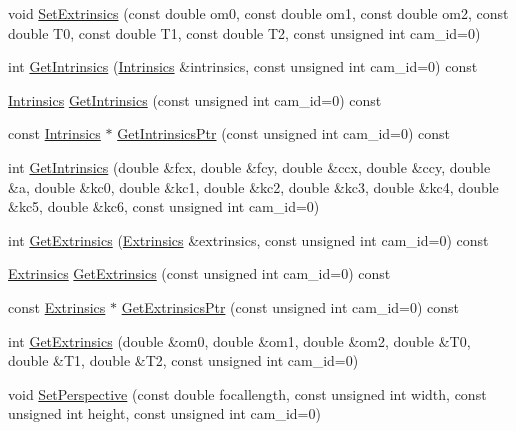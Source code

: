 \begin{DoxyCompactItemize}
\item 
void \hyperlink{classsvl_sample_camera_geometry_aaf76200111c3e78b6b8ad3593d0abcbe}{Set\-Extrinsics} (const double om0, const double om1, const double om2, const double T0, const double T1, const double T2, const unsigned int cam\-\_\-id=0)
\item 
int \hyperlink{classsvl_sample_camera_geometry_a0605f6149bc673ddda2fdff62e18fb52}{Get\-Intrinsics} (\hyperlink{structsvl_sample_camera_geometry_1_1_intrinsics}{Intrinsics} \&intrinsics, const unsigned int cam\-\_\-id=0) const 
\item 
\hyperlink{structsvl_sample_camera_geometry_1_1_intrinsics}{Intrinsics} \hyperlink{classsvl_sample_camera_geometry_a25b5b31b9ce6662f5de3ed000e52d3a2}{Get\-Intrinsics} (const unsigned int cam\-\_\-id=0) const 
\item 
const \hyperlink{structsvl_sample_camera_geometry_1_1_intrinsics}{Intrinsics} $\ast$ \hyperlink{classsvl_sample_camera_geometry_a8f535e5d368211f7e6e2e038acf7dcba}{Get\-Intrinsics\-Ptr} (const unsigned int cam\-\_\-id=0) const 
\item 
int \hyperlink{classsvl_sample_camera_geometry_a9a989dee923b87befa750a247134170a}{Get\-Intrinsics} (double \&fcx, double \&fcy, double \&ccx, double \&ccy, double \&a, double \&kc0, double \&kc1, double \&kc2, double \&kc3, double \&kc4, double \&kc5, double \&kc6, const unsigned int cam\-\_\-id=0)
\item 
int \hyperlink{classsvl_sample_camera_geometry_afaa5b9430fedd4e6a2a64096384b1246}{Get\-Extrinsics} (\hyperlink{structsvl_sample_camera_geometry_1_1_extrinsics}{Extrinsics} \&extrinsics, const unsigned int cam\-\_\-id=0) const 
\item 
\hyperlink{structsvl_sample_camera_geometry_1_1_extrinsics}{Extrinsics} \hyperlink{classsvl_sample_camera_geometry_a11d0dbf26b9e178040ae525f3245757f}{Get\-Extrinsics} (const unsigned int cam\-\_\-id=0) const 
\item 
const \hyperlink{structsvl_sample_camera_geometry_1_1_extrinsics}{Extrinsics} $\ast$ \hyperlink{classsvl_sample_camera_geometry_a9a1b78d25fb357c1aa2f19975077fd1e}{Get\-Extrinsics\-Ptr} (const unsigned int cam\-\_\-id=0) const 
\item 
int \hyperlink{classsvl_sample_camera_geometry_a7a0a0c3797c0736cc0747ec3e0726325}{Get\-Extrinsics} (double \&om0, double \&om1, double \&om2, double \&T0, double \&T1, double \&T2, const unsigned int cam\-\_\-id=0)
\item 
void \hyperlink{classsvl_sample_camera_geometry_a34028d18bb53dc980e32b7069c591ee2}{Set\-Perspective} (const double focallength, const unsigned int width, const unsigned int height, const unsigned int cam\-\_\-id=0)

\end{DoxyCompactItemize}
